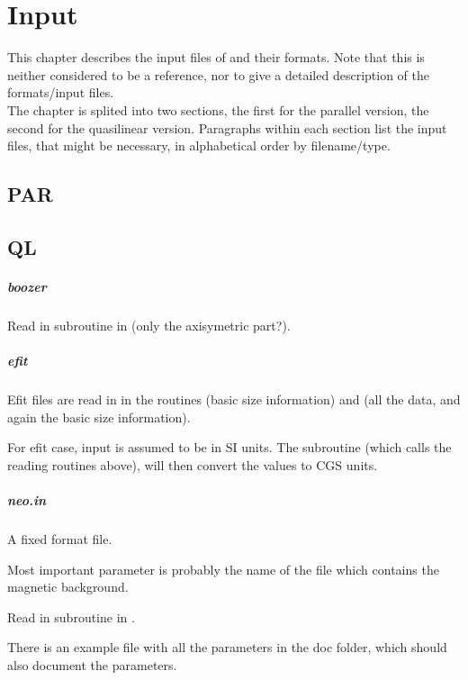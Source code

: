 \chapter{Input\label{ch:input}}
This chapter describes the input files of \neotwo and their formats.
Note that this is neither considered to be a reference, nor to give a
detailed description of the formats/input files.\\
The chapter is splited into two sections, the first for the parallel
version, the second for the quasilinear version. Paragraphs within each
section list the input files, that might be necessary, in alphabetical
order by filename/type.

\section{PAR}


\section{QL}


\paragraph{boozer}
Read in subroutine  in  (only
the axisymetric part?).

\paragraph{efit}
Efit files are read in  in the routines
 (basic size information) and
 (all the data, and again the basic size
information).

For efit case, input is assumed to be in SI units. The subroutine
 (which calls the reading routines above), will
then convert the values to CGS units.

\paragraph{neo.in}
A fixed format file.

Most important parameter is probably the name of the file which contains
the magnetic background.

Read in subroutine  in
.

There is an example file with all the parameters in the doc folder,
which should also document the parameters.

